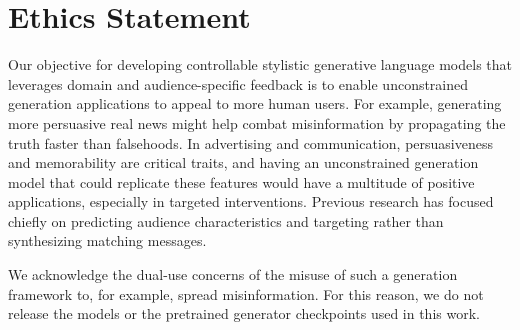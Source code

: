 \section{Ethics Statement}
\label{sec:ethics}

Our objective for developing controllable stylistic generative language models that leverages domain and audience-specific feedback is to enable unconstrained generation applications to appeal to more human users. For example, generating more persuasive real news might help combat misinformation by propagating the truth faster than falsehoods. In advertising and communication, persuasiveness and memorability are critical traits, and having an unconstrained generation model that could replicate these features would have a multitude of positive applications, especially in targeted interventions. Previous research has focused chiefly on predicting audience characteristics and targeting rather than synthesizing matching messages.

We acknowledge the dual-use concerns of the misuse of such a generation framework to, for example, spread misinformation. For this reason, we do not release the models or the pretrained generator checkpoints used in this work. 